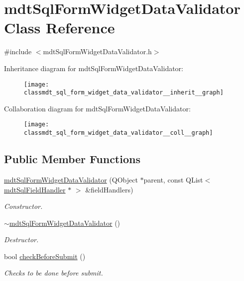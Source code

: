 \hypertarget{classmdt_sql_form_widget_data_validator}{\section{mdt\-Sql\-Form\-Widget\-Data\-Validator Class Reference}
\label{classmdt_sql_form_widget_data_validator}
}


{\ttfamily \#include $<$mdt\-Sql\-Form\-Widget\-Data\-Validator.\-h$>$}



Inheritance diagram for mdt\-Sql\-Form\-Widget\-Data\-Validator\-:
\nopagebreak
\begin{figure}[H]
\begin{center}
\leavevmode
\texttt{[image: classmdt\_sql\_form\_widget\_data\_validator\_\_inherit\_\_graph]}
\end{center}
\end{figure}


Collaboration diagram for mdt\-Sql\-Form\-Widget\-Data\-Validator\-:
\nopagebreak
\begin{figure}[H]
\begin{center}
\leavevmode
\texttt{[image: classmdt\_sql\_form\_widget\_data\_validator\_\_coll\_\_graph]}
\end{center}
\end{figure}
\subsection*{Public Member Functions}
\begin{DoxyCompactItemize}
\item 
\hyperlink{classmdt_sql_form_widget_data_validator_af26a73385c7e737abb2dbc39e7301cfa}{mdt\-Sql\-Form\-Widget\-Data\-Validator} (Q\-Object $\ast$parent, const Q\-List$<$ \hyperlink{classmdt_sql_field_handler}{mdt\-Sql\-Field\-Handler} $\ast$ $>$ \&field\-Handlers)
\begin{DoxyCompactList}\small\item\em Constructor. \end{DoxyCompactList}\item 
\hyperlink{classmdt_sql_form_widget_data_validator_aec2505ec4b25b1fae3e37cd13f4afe07}{$\sim$mdt\-Sql\-Form\-Widget\-Data\-Validator} ()
\begin{DoxyCompactList}\small\item\em Destructor. \end{DoxyCompactList}\item 
bool \hyperlink{classmdt_sql_form_widget_data_validator_aa577e4acf4d0f371c45a67c18c59a924}{check\-Before\-Submit} ()
\begin{DoxyCompactList}\small\item\em Checks to be done before submit. \end{DoxyCompactList}\end{DoxyCompactItemize}
